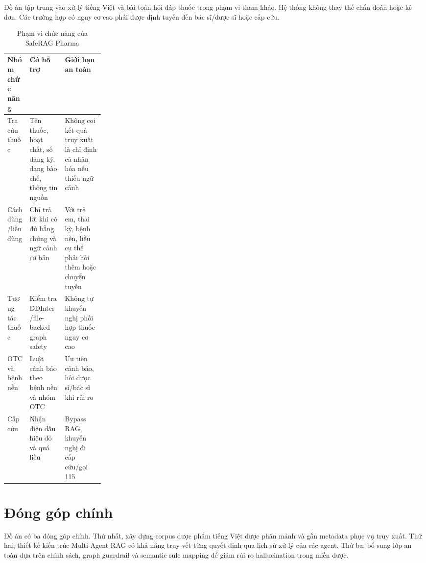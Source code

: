 Đồ án tập trung vào xử lý tiếng Việt và bài toán hỏi đáp thuốc trong phạm vi tham khảo. Hệ thống không thay thế chẩn đoán hoặc kê đơn. Các trường hợp có nguy cơ cao phải được định tuyến đến bác sĩ/dược sĩ hoặc cấp cứu.

\begin{table}[H]
\centering
\small
\caption{Phạm vi chức năng của SafeRAG Pharma}
\begin{tabularx}{\linewidth}{p{0.23\linewidth} Y Y}
\toprule
\textbf{Nhóm chức năng} & \textbf{Có hỗ trợ} & \textbf{Giới hạn an toàn} \\
\midrule
Tra cứu thuốc & Tên thuốc, hoạt chất, số đăng ký, dạng bào chế, thông tin nguồn & Không coi kết quả truy xuất là chỉ định cá nhân hóa nếu thiếu ngữ cảnh \\
Cách dùng/liều dùng & Chỉ trả lời khi có đủ bằng chứng và ngữ cảnh cơ bản & Với trẻ em, thai kỳ, bệnh nền, liều cụ thể phải hỏi thêm hoặc chuyển tuyến \\
Tương tác thuốc & Kiểm tra DDInter/file-backed graph safety & Không tự khuyến nghị phối hợp thuốc nguy cơ cao \\
OTC và bệnh nền & Luật cảnh báo theo bệnh nền và nhóm OTC & Ưu tiên cảnh báo, hỏi dược sĩ/bác sĩ khi rủi ro \\
Cấp cứu & Nhận diện dấu hiệu đỏ và quá liều & Bypass RAG, khuyến nghị đi cấp cứu/gọi 115 \\
\bottomrule
\end{tabularx}
\end{table}

\section{Đóng góp chính}

Đồ án có ba đóng góp chính. Thứ nhất, xây dựng corpus dược phẩm tiếng Việt được phân mảnh và gắn metadata phục vụ truy xuất. Thứ hai, thiết kế kiến trúc Multi-Agent RAG có khả năng truy vết từng quyết định qua lịch sử xử lý của các agent. Thứ ba, bổ sung lớp an toàn dựa trên chính sách, graph guardrail và semantic rule mapping để giảm rủi ro hallucination trong miền dược.
